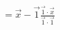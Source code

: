 \documentclass[preview]{standalone}
\begin{document}
\begin{align*}
= \overrightarrow{x} - \overrightarrow{1} \frac{\overrightarrow{1} \cdot \overrightarrow{x}}{\overrightarrow{1} \cdot\overrightarrow{1}}
\end{align*}
\end{document}
